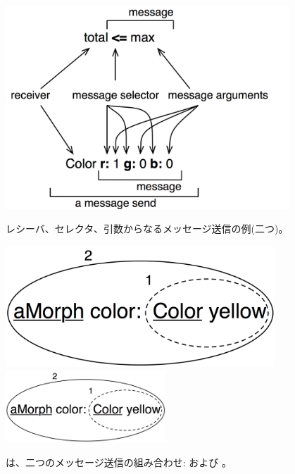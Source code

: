 \documentclass[a4paper,10pt,twoside]{book}
\begin{document}
\begin{figure}[htb]
\begin{minipage}{0.53\textwidth}
	\begin{center}
	\includegraphics[width=0.95\textwidth]{message}
	\caption{レシーバ、セレクタ、引数からなるメッセージ送信の例(二つ)。}\end{center}
\end{minipage}
\hfill
\begin{minipage}{0.43\textwidth}
	\begin{center}
	\ifluluelse
		{\includegraphics[width=0.9\textwidth]{uKeyUnOne}}
		{\includegraphics[width=6cm]{uKeyUnOne}}
	\caption{ は、二つのメッセージ送信の組み合わせ:  および 。}
	\end{center}
\end{minipage}
\end{figure}
\end{document}
